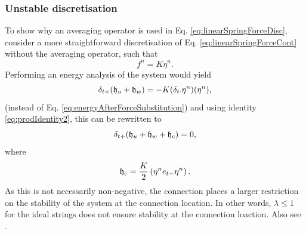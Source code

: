 \subsubsection{Unstable discretisation}
To show why an averaging operator is used in Eq. \eqref{eq:linearSpringForceDisc}, consider a more straightforward discretisation of Eq. \eqref{eq:linearSpringForceCont} without the averaging operator, such that
\begin{equation*}
    f^n = K\eta^n.
\end{equation*}
Performing an energy analysis of the system would yield 
\begin{equation*}
    \delta_{t+} (\mathfrak{h}_u + \mathfrak{h}_w) = -K(\delta_{t\cdot} \eta^n) (\eta^n),
\end{equation*}
(instead of Eq. \eqref{eq:energyAfterForceSubstitution}) and using identity \eqref{eq:prodIdentity2}, this can be rewritten to
\begin{equation*}
    \delta_{t+} (\mathfrak{h}_u + \mathfrak{h}_w + \mathfrak{h}_{\text{c}}) = 0,
\end{equation*}
where
\begin{equation*}
    \mathfrak{h}_{\text{c}} = \frac{K}{2}\left(\eta^ne_{t-}\eta^n\right).
\end{equation*}
As this is not necessarily non-negative, the connection places a larger restriction on the stability of the system at the connection location. In other words, $\lambda \leq 1$ for the ideal strings does not ensure stability at the connection loaction. Also see \cite[pp. 190--192]{theBible}.




